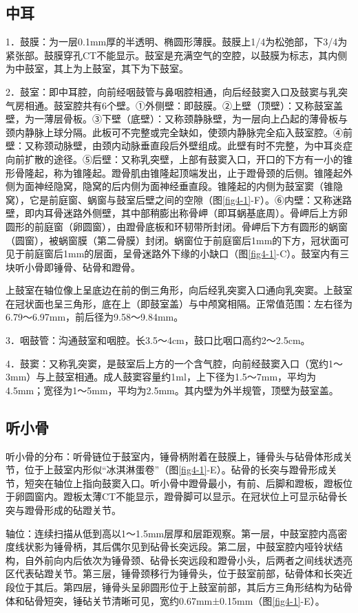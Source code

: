 \subsection{中耳}

1．鼓膜：为一层0.1mm厚的半透明、椭圆形薄膜。鼓膜上1/4为松弛部，下3/4为紧张部。鼓膜穿孔CT不能显示。鼓室是充满空气的空腔，以鼓膜为标志，其内侧为中鼓室，其上为上鼓室，其下为下鼓室。

2．鼓室：即中耳腔，向前经咽鼓管与鼻咽腔相通，向后经鼓窦入口及鼓窦与乳突气房相通。鼓室腔共有6个壁。①外侧壁：即鼓膜。②上壁（顶壁）：又称鼓室盖壁，为一薄层骨板。③下壁（底壁）：又称颈静脉壁，为一层向上凸起的薄骨板与颈内静脉上球分隔。此板可不完整或完全缺如，使颈内静脉完全疝入鼓室腔。④前壁：又称颈动脉壁，由颈内动脉垂直段后外壁组成。此壁有时不完整，为中耳炎症向前扩散的途径。⑤后壁：又称乳突壁，上部有鼓窦入口，开口的下方有一小的锥形骨隆起，称为锥隆起。蹬骨肌由锥隆起顶端发出，止于蹬骨颈的后侧。锥隆起外侧为面神经隐窝，隐窝的后内侧为面神经垂直段。锥隆起的内侧为鼓室窦（锥隐窝），它是前庭窗、蜗窗与鼓室后壁之间的空隙（图\ref{fig4-1}-F）。⑥内壁：又称迷路壁，即内耳骨迷路外侧壁，其中部稍膨出称骨岬（即耳蜗基底周）。骨岬后上方卵圆形的前庭窗（卵圆窗），由蹬骨底板和环韧带所封闭。骨岬后下方有圆形的蜗窗（圆窗），被蜗窗膜（第二骨膜）封闭。蜗窗位于前庭窗后1mm的下方，冠状面可见于前庭窗后1mm的层面，呈骨迷路外下缘的小缺口（图\ref{fig4-1}-C）。鼓室内有三块听小骨即锤骨、砧骨和蹬骨。

上鼓室在轴位像上呈底边在前的倒三角形，向后经乳突窦入口通向乳突窦。上鼓室在冠状面也呈三角形，底在上（即鼓室盖）与中颅窝相隔。正常值范围：左右径为6.79～6.97mm，前后径为9.58～9.84mm。

3．咽鼓管：沟通鼓室和咽腔。长3.5～4cm，鼓口比咽口高约2～2.5cm。

4．鼓窦：又称乳突窦，是鼓室后上方的一个含气腔，向前经鼓窦入口（宽约1～3mm）与上鼓室相通。成人鼓窦容量约1ml，上下径为1.5～7mm，平均为4.5mm；宽径为1～5mm，平均为2.5mm。其内壁为外半规管，顶壁为鼓室盖。

\subsection{听小骨}

听小骨的分布：听骨链位于鼓室内，锤骨柄附着在鼓膜上，锤骨头与砧骨体形成关节，位于上鼓室内形似“冰淇淋蛋卷”（图\ref{fig4-1}-E）。砧骨的长突与蹬骨形成关节，短突在轴位上指向鼓窦入口。听小骨中蹬骨最小，有前、后脚和蹬板，蹬板位于卵圆窗内。蹬板太薄CT不能显示，蹬骨脚可以显示。在冠状位上可显示砧骨长突与蹬骨形成的砧蹬关节。

轴位：连续扫描从低到高以1～1.5mm层厚和层距观察。第一层，中鼓室腔内高密度线状影为锤骨柄，其后偶尔见到砧骨长突远段。第二层，中鼓室腔内哑铃状结构，自外前向内后依次为锤骨颈、砧骨长突远段和蹬骨小头，后两者之间线状透亮区代表砧蹬关节。第三层，锤骨颈移行为锤骨头，位于鼓室前部，砧骨体和长突近段位于其后。第四层，锤骨头呈卵圆形位于上鼓室前部，其后方三角形结构为砧骨体和砧骨短突，锤砧关节清晰可见，宽约0.67mm±0.15mm（图\ref{fig4-1}-E）。

